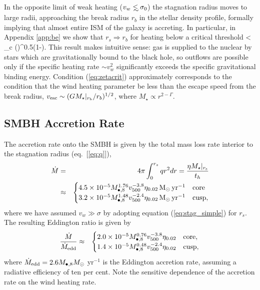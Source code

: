 \documentclass[usenatbib,fleqn]{mn2e}
\newcommand\lsim{\mathrel{\rlap{\lower4pt\hbox{\hskip1pt$\sim$}}
    \raise1pt\hbox{$<$}}}
\newcommand{\rs}{r_s}
\newcommand{\rb}{r_b}
\newcommand{\Mbheight}{M_{\bullet,8}}
\newcommand{\soi}{\rm soi}
\newcommand{\rsoi}{r_{\soi}}
\newcommand{\pyear}{{\rm yr}^{-1}}
\renewcommand{\th}{t_h}
\begin{document}
In the opposite limit of weak heating ($v_w\lsim \sigma_0$) the stagnation radius moves to large radii, approaching the break radius $\rb$ in the stellar density profile, formally implying that almost entire ISM of the galaxy is accreting.  In particular, in Appendix \ref{app:be} we show that $\rs \Rightarrow \rb$ for heating below a critical threshold
\be
\zeta\equiv {} < \zeta_c \approx \left(\frac{\rb}{\rsoi}\right)^{0.5(1-\Gamma)}.
\label{eq:zetacrit}
\ee
This result makes intuitive sense: gas is supplied to the nuclear by stars which are gravitationally bound to the black hole, so outflows are possible only if the specific heating rate $\sim v_{w}^{2}$ significantly exceeds the specific gravitational binding energy.  Condition (\ref{eq:zetacrit}) approximately corresponds to the condition that the wind heating parameter be less than the escape speed from the break radius, $v_{\rm esc} \sim (GM_{\star}|_{r_{\rm b}}/r_b)^{1/2}$, where $M_{\star} \propto r^{2-\Gamma}$.

\subsection{SMBH Accretion Rate}

The accretion rate onto the SMBH is given by the total mass loss rate interior to the stagnation radius (eq.~[\ref{eq:q}]), 
\begin{eqnarray}
  \dot{M} &=& 4\pi \int_{0}^{r_{s}}q r^{2}dr = \frac{\eta M_{\star}|_{r_{\rm s}}}{\th} \nonumber \\
&\approx&
  \begin{cases}
    4.5 \times 10^{-5} M_{\bullet,8}^{1.76}
    v_{500}^{-3.8}  \eta_{0.02} \Msun \, \pyear& \text{core} \\
    3.2 \times 10^{-5} M_{\bullet,8}^{1.48} 
    v_{500}^{-2.4}  \eta_{0.02} \Msun \, \pyear  & \text{cusp}, 
  \end{cases}
  \label{eq:mdot_analytic}
\end{eqnarray}
where we have assumed $v_{w} \gg \sigma$ by adopting equation (\ref{eq:stag_simple}) for $r_s$.  The resulting Eddington ratio is given by 
\begin{eqnarray}
\frac{\dot{M}}{\dot{M}_{\rm edd}} &\approx&
  \begin{cases}
    2.0 \times 10^{-5} M_{\bullet,8}^{0.76}
    v_{500}^{-3.8}  \eta_{0.02}   & \text{core}, \\
    1.4 \times 10^{-5} \Mbheight^{0.48} 
    v_{500}^{-2.4}  \eta_{0.02}   & \text{cusp}, 
  \end{cases}
  \label{eq:eddr_analytic}
\end{eqnarray}
where $\dot{M}_{\rm edd} = 2.6M_{\bullet,8}M_{\odot}$ yr$^{-1}$ is the
Eddington accretion rate, assuming a radiative efficiency of ten per
cent.  Note the sensitive dependence of the accretion rate on
the wind heating rate.
\end{document}
